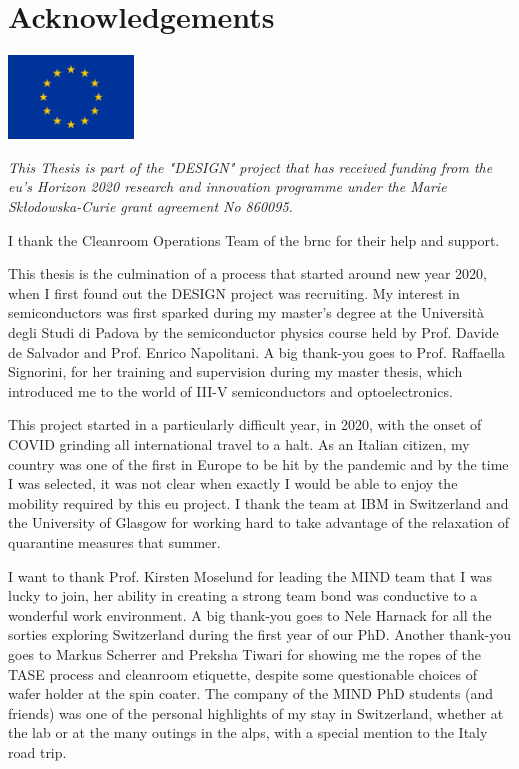 \chapter{Acknowledgements}

\begin{center}
    \includegraphics[width=0.25\textwidth]{0_Abstract/EU_Flag.pdf}
\end{center}

\noindent \textit{This Thesis is part of the "\acl{DESIGN}" project that has received funding from the \acl{eu}'s Horizon 2020 research and innovation programme under the Marie Skłodowska-Curie grant agreement No 860095.}

I thank the Cleanroom Operations Team of the \acl{brnc} for their help and support.
\vspace{\baselineskip}


\noindent This thesis is the culmination of a process that started around new year 2020, when I first found out the \acs{DESIGN} project was recruiting. My interest in semiconductors was first sparked during my master's degree at the Università degli Studi di Padova by the semiconductor physics course held by Prof. Davide de Salvador and Prof. Enrico Napolitani. A big thank-you goes to Prof. Raffaella Signorini, for her training and supervision during my master thesis, which introduced me to the world of III-V semiconductors and optoelectronics.

This project started in a particularly difficult year, in 2020, with the onset of COVID grinding all international travel to a halt. As an Italian citizen, my country was one of the first in Europe to be hit by the pandemic and by the time I was selected, it was not clear when exactly I would be able to enjoy the mobility required by this \acs{eu} project. I thank the team at IBM in Switzerland and the University of Glasgow for working hard to take advantage of the relaxation of quarantine measures that summer. 

I want to thank Prof. Kirsten Moselund for leading the MIND team that I was lucky to join, her ability in creating a strong team bond was conductive to a wonderful work environment. A big thank-you goes to Nele Harnack for all the sorties exploring Switzerland during the first year of our PhD. Another thank-you goes to Markus Scherrer and Preksha Tiwari for showing me the ropes of the \acs{TASE} process and cleanroom etiquette, despite some questionable choices of wafer holder at the spin coater. The company of the MIND PhD students (and friends) was one of the personal highlights of my stay in Switzerland, whether at the lab or at the many outings in the alps, with a special mention to the Italy road trip.

